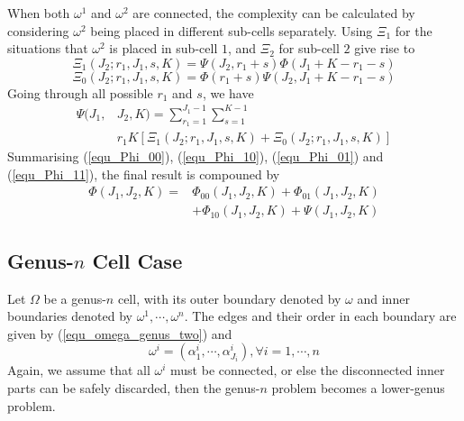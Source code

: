 \documentclass[journal]{IEEEtran}
\begin{document}
When both $\omega^1$ and $\omega^2$ are connected, the complexity can be calculated by considering $\omega^2$ being placed in 
different sub-cells separately. Using $\Xi_1$ for the situations that $\omega^2$ is placed in sub-cell $1$, 
and $\Xi_2$ for sub-cell $2$ give rise to
\begin{equation}
\Xi_{1}(J_2; r_1, J_1, s, K) = \Psi(J_2, r_1+s)\Phi(J_1+K-r_1-s)
\end{equation}
\begin{equation}
\Xi_{0}(J_2; r_1, J_1, s, K) = \Phi(r_1+s)\Psi(J_2, J_1+K-r_1-s)
\end{equation}
Going through all possible $r_1$ and $s$, we have 
\begin{equation}\label{equ_Phi_11}
\begin{aligned}
\Psi(J_1, &J_2, K) = \sum\limits_{r_1 = 1}^{J_1-1}\sum\limits_{s = 1}^{K-1}\\
&r_1K\left[\Xi_1\left(J_2; r_1, J_1, s, K\right) + \Xi_0\left(J_2; r_1, J_1, s, K\right)\right]
\end{aligned}
\end{equation} 
Summarising (\ref{equ_Phi_00}), (\ref{equ_Phi_10}), (\ref{equ_Phi_01}) and (\ref{equ_Phi_11}), the final result is compouned by
\begin{equation}
\begin{aligned}
\Phi(J_1, J_2, K) =& \Phi_{00}(J_1, J_2, K) + \Phi_{01}(J_1, J_2, K)\\
& + \Phi_{10}(J_1, J_2, K) + \Psi(J_1, J_2, K)
\end{aligned}
\end{equation}

\subsection{Genus-$n$ Cell Case}
Let $\Omega$ be a genus-$n$ cell, with its outer boundary denoted by $\omega$ and inner boundaries denoted by $\omega^1, \cdots, \omega^n$. The edges and their order in each boundary are given by (\ref{equ_omega_genus_two}) and 
\begin{equation}\label{equ_inner_boundaries}
\omega^i = (\alpha^i_1, \cdots, \alpha^i_{J_i}), \forall i = 1, \cdots, n
\end{equation}
Again, we assume that all $\omega^i$ must be connected, or else the disconnected inner parts can be safely discarded, then the genus-$n$ problem becomes a lower-genus problem. 
\end{document}
